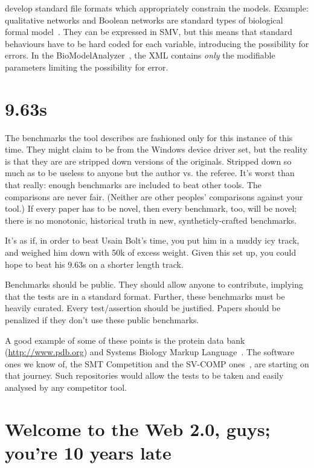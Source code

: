 \documentclass[conference]{IEEEtran}
\begin{document}
develop standard file formats which appropriately constrain the
models. Example: qualitative networks and Boolean networks are
standard types of biological formal
model~\cite{Kauffman1969,Schaub2007}. They can be expressed in SMV,
but this means that standard behaviours have to be hard coded for each
variable, introducing the possibility for errors. In the
BioModelAnalyzer~\cite{Benque2012}, the XML contains \emph{only} the
modifiable parameters limiting the possibility for error.


\section{9.63s} 

The benchmarks the tool describes are fashioned only for this instance
of this time. They might claim to be from the Windows device driver
set, but the reality is that they are are stripped down versions of
the originals. Stripped down so much as to be useless to anyone but
the author vs. the referee. It's worst than that really: enough
benchmarks are included to beat other tools. The comparisons are never
fair. (Neither are other peoples' comparisons against your tool.) If
every paper has to be novel, then every benchmark, too, will be novel;
there is no monotonic, historical truth in new, syntheticly-crafted
benchmarks.

It's as if, in order to beat Usain Bolt's time, you put him in a muddy
icy track, and weighed him down with 50k of excess weight. Given this
set up, you could hope to beat his 9.63s on a shorter length track.

Benchmarks should be public. They should allow anyone to contribute,
implying that the tests are in a standard format. Further, these
benchmarks must be heavily curated. Every test/assertion should be
justified. Papers should be penalized if they don't use these public
benchmarks.

A good example of some of these points is the protein data bank
(\url{http://www.pdb.org}) and Systems Biology Markup
Language~\cite{Hucka2003,Chaouiya2013}. The software ones we know of,
the SMT Competition and the SV-COMP ones~\cite{SMTComp, SVCOMP}, are
starting on that journey. Such repositories would allow the tests to
be taken and easily analysed by any competitor tool. 

\section{Welcome to the Web 2.0, guys; you're 10 years late} 
\end{document}
